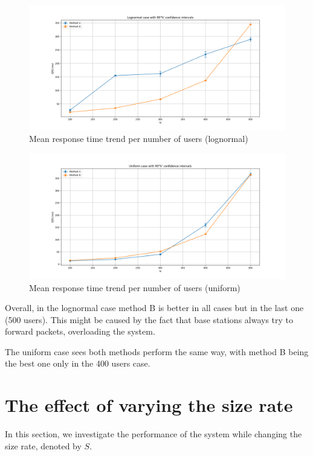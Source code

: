 \documentclass{report}
\begin{document}
\begin{figure}[H]
    \centering
    \includegraphics[width=\textwidth]{img/Grafici/Lognormal Case.png}
    \caption{Mean response time trend per number of users (lognormal)}
\end{figure}
\begin{figure}[H]
    \centering
    \includegraphics[width=\textwidth]{img/Grafici/Uniform Case.png}
    \caption{Mean response time trend per number of users (uniform)}
\end{figure}

\begin{flushleft}
Overall, in the lognormal case method B is better in all cases but in the last one (500 users). This might be caused by the fact that base stations always try to forward packets, overloading the system.
\end{flushleft}

\begin{flushleft}
The uniform case sees both methods perform the same way, with method B being the best one only in the 400 users case.
\end{flushleft}

\section{The effect of varying the size rate}
In this section, we investigate the performance of the system while changing the size rate, denoted by $S$. 
\end{document}
